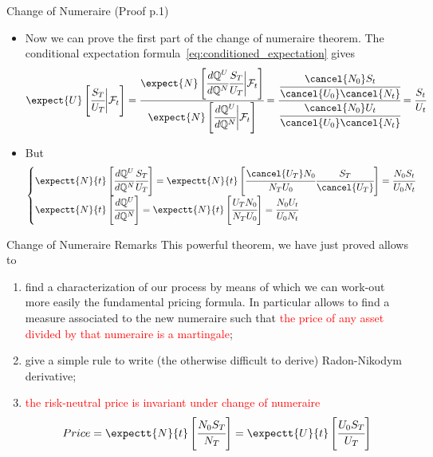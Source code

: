 \documentclass{beamer}
\begin{document}
\begin{frame}{Change of Numeraire (Proof p.1)}
	\begin{itemize}
		\item Now we can prove the first part of the change of numeraire theorem. The conditional expectation formula~\cref{eq:conditioned_expectation} gives
		\begin{equation*}
			\expect{U}\left[\cfrac{S_T}{U_T}\bigg|\mathcal{F}_t\right]=\cfrac{\expect{N}\left[\cfrac{d\mathbb{Q}^U}{d\mathbb{Q}^N}\cfrac{S_T}{U_T}\bigg|\mathcal{F}_t\right]}{\expect{N}\left[\cfrac{d\mathbb{Q}^U}{d\mathbb{Q}^N}\bigg|\mathcal{F}_t\right]} = \cfrac{\cfrac{\cancel{N_0} S_t}{\cancel{U_0} \cancel{N_t}}}{\cfrac{\cancel{N_0} U_t}{\cancel{U_0} \cancel{N_t}}} = \cfrac{S_t}{U_t}
		\end{equation*}
		\item But 
		\begin{equation*}
			\begin{cases}
				\expectt{N}{t}\left[\cfrac{d\mathbb{Q}^U}{d\mathbb{Q}^N}\cfrac{S_T}{U_T}\right]= \expectt{N}{t}\left[\cfrac{\cancel{U_T} N_0}{N_T U_0}\cfrac{S_T}{\cancel{U_T}}\right]=\cfrac{N_0 S_t}{U_0 N_t} \\
				\expectt{N}{t}\left[\cfrac{d\mathbb{Q}^U}{d\mathbb{Q}^N}\right]= \expectt{N}{t}\left[\cfrac{U_T N_0}{N_T U_0}\right] = \cfrac{N_0 U_t}{U_0 N_t}
			\end{cases}
		\end{equation*}
	\end{itemize}
\end{frame}	

\begin{frame}{Change of Numeraire Remarks}
  This powerful theorem, we have just proved allows to
\begin{enumerate}
    \item find a characterization of our process by means of which we can work-out more easily the fundamental pricing formula. In particular allows to find a measure associated to the new numeraire such that \textcolor{red}{the price of any asset divided by that numeraire is a martingale};
    \item give a simple rule to write (the otherwise difficult to derive) Radon-Nikodym derivative;
      \item \textcolor{red}{the risk-neutral price is invariant under change of numeraire}
    \begin{equation*}
    	Price = \expectt{N}{t}\left[\cfrac{N_0 S_T}{N_T}\right] = \expectt{U}{t}\left[\cfrac{U_0 S_T}{U_T}\right]
    \end{equation*}
    \end{enumerate}
\end{frame}
\end{document}
